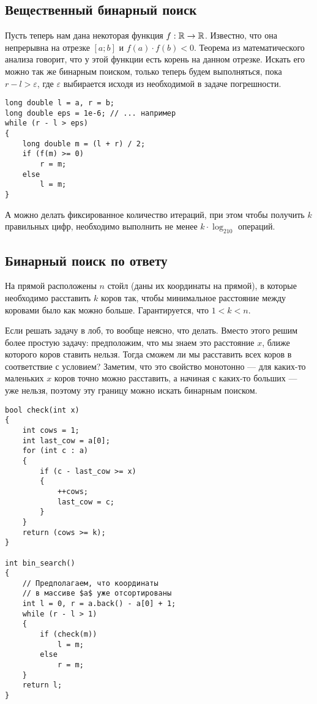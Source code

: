 \subsection{Вещественный бинарный поиск}

Пусть теперь нам дана некоторая функция $f: \mathbb{R} \to \mathbb{R}$. Известно, что она непрерывна на отрезке $[a; b]$ и $f(a) \cdot f(b) < 0$. Теорема из математического анализа говорит, что у этой функции есть корень на данном отрезке. Искать его можно так же бинарным поиском, только теперь будем выполняться, пока $r - l > \varepsilon$, где $\varepsilon$ выбирается исходя из необходимой в задаче погрешности.

\begin{verbatim}
long double l = a, r = b;
long double eps = 1e-6; // ... например
while (r - l > eps)
{
    long double m = (l + r) / 2;
    if (f(m) >= 0)
        r = m;
    else
        l = m;
}
\end{verbatim}

А можно делать фиксированное количество итераций, при этом чтобы получить $k$ правильных цифр, необходимо выполнить не менее $k \cdot \log_210$ операций.

\subsection{Бинарный поиск по ответу}

\begin{problem}
    На прямой расположены $n$ стойл (даны их координаты на прямой), в которые необходимо расставить $k$ коров так, чтобы минимальное расстояние между коровами было как можно больше. Гарантируется, что $1 < k < n$.
\end{problem}

Если решать задачу в лоб, то вообще неясно, что делать. Вместо этого решим более простую задачу: предположим, что мы знаем это расстояние $x$, ближе которого коров ставить нельзя. Тогда сможем ли мы расставить всех коров в соответствие с условием? Заметим, что это свойство монотонно --- для каких-то маленьких $x$ коров точно можно расставить, а начиная с каких-то больших --- уже нельзя, поэтому эту границу можно искать бинарным поиском.

\begin{verbatim}
bool check(int x)
{
    int cows = 1;
    int last_cow = a[0];
    for (int c : a)
    {
        if (c - last_cow >= x)
        {
            ++cows;
            last_cow = c;
        }
    }
    return (cows >= k);
}

int bin_search()
{
    // Предполагаем, что координаты
    // в массиве $a$ уже отсортированы
    int l = 0, r = a.back() - a[0] + 1;
    while (r - l > 1)
    {
        if (check(m))
            l = m;
        else
            r = m;
    }
    return l;
}
\end{verbatim}

